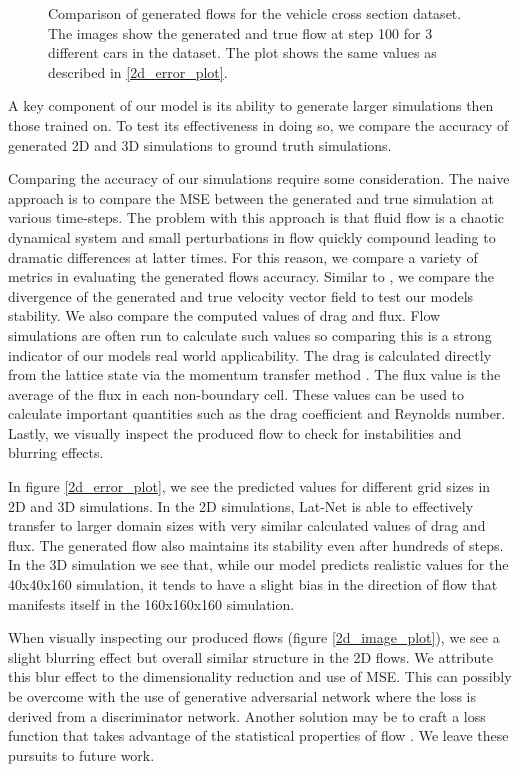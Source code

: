 \documentclass{article}
\begin{document}
\begin{figure}[!t]
\caption{Comparison of generated flows for the vehicle cross section dataset. The images show the generated and true flow at step 100 for 3 different cars in the dataset. The plot shows the same values as described in \ref{2d_error_plot}.}
\label{car_dataset}
\end{figure}


A key component of our model is its ability to generate larger simulations then those trained on. To test its effectiveness in doing so, we compare the accuracy of generated 2D and 3D simulations to ground truth simulations.

Comparing the accuracy of our simulations require some consideration. The naive approach is to compare the MSE between the generated and true simulation at various time-steps. The problem with this approach is that fluid flow is a chaotic dynamical system and small perturbations in flow quickly compound leading to dramatic differences at latter times. For this reason, we compare a variety of metrics in evaluating the generated flows accuracy. Similar to \cite{tompson2016accelerating}, we compare the divergence of the generated and true velocity vector field to test our models stability. We also compare the computed values of drag and flux. Flow simulations are often run to calculate such values so comparing this is a strong indicator of our models real world applicability. The drag is calculated directly from the lattice state via the momentum transfer method \cite{guo2013lattice}. The flux value is the average of the flux in each non-boundary cell. These values can be used to calculate important quantities such as the drag coefficient and Reynolds number. Lastly, we visually inspect the produced flow to check for instabilities and blurring effects.

In figure \ref{2d_error_plot}, we see the predicted values for different grid sizes in 2D and 3D simulations. In the 2D simulations, Lat-Net is able to effectively transfer to larger domain sizes with very similar calculated values of drag and flux. The generated flow also maintains its stability even after hundreds of steps. In the 3D simulation we see that, while our model predicts realistic values for the 40x40x160 simulation, it tends to have a slight bias in the direction of flow that manifests itself in the 160x160x160 simulation.

When visually inspecting our produced flows (figure \ref{2d_image_plot}), we see a slight blurring effect but overall similar structure in the 2D flows. We attribute this blur effect to the dimensionality reduction and use of MSE. This can possibly be overcome with the use of generative adversarial network \cite{goodfellow2014generative} where the loss is derived from a discriminator network. Another solution may be to craft a loss function that takes advantage of the statistical properties of flow \cite{kim2008wavelet}. We leave these pursuits to future work.
\end{document}
